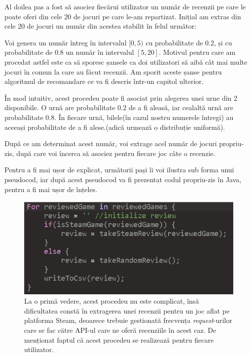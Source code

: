 \documentclass[12pt,a4paper]{report}
\begin{document}
Al doilea pas a fost să asociez fiecărui utilizator un număr de recenzii pe care le poate oferi din cele 20 de jocuri pe care le-am repartizat. Inițial am extras din cele 20 de jocuri un număr din acestea stabilit în felul următor:

\bigskip

Voi genera un număr întreg în intervalul \([0, 5) \) cu probabilitate de \(0.2 \), și cu probabilitate de \( 0.8 \) un număr în intervalul \([5, 20] \). Motivul pentru care am procedat astfel este ca să sporesc șansele ca doi utilizatori să aibă cât mai multe jocuri în comun la care au făcut recenzii. Am sporit aceste șanse pentru algoritmul de recomandare ce va fi descris într-un capitol ulterior.

În mod intuitiv, acest procedeu poate fi asociat prin alegerea unei urne din 2 disponibile. O urnă are probabilitate \( 0.2 \) de a fi aleasă, iar cealaltă urnă are probabilitate \( 0.8 \). În fiecare urnă, bilele(în cazul nostru numerele întregi) au aceeași probabilitate de a fi alese.(adică urmează o distribuție uniformă).

\bigskip

După ce am determinat acest număr, voi extrage acel număr de jocuri propriu-zis, după care voi încerca să asociez pentru fiecare joc câte o recenzie. 

Pentru a fi mai ușor de explicat, următorii pași îi voi ilustra sub forma unui pseudocod, iar după acest pseudocod va fi prezentat codul propriu-zis în Java, pentru a fi mai ușor de înțeles.

\begin{figure}[H]
\centering
\caption{}
\includegraphics[scale = 0.8]{exemplu_13_review_code}
\caption*{La o primă vedere, acest procedeu nu este complicat, însă dificultatea constă în extragerea unei recenzii pentru un joc aflat pe platforma Steam, deoarece trebuie gestionată frecvența \emph{request}-urilor care se fac către API-ul care ne oferă recenziile în acest caz. De menționat faptul că acest procedeu se realizează pentru fiecare utilizator.}
\end{figure}
\end{document}
